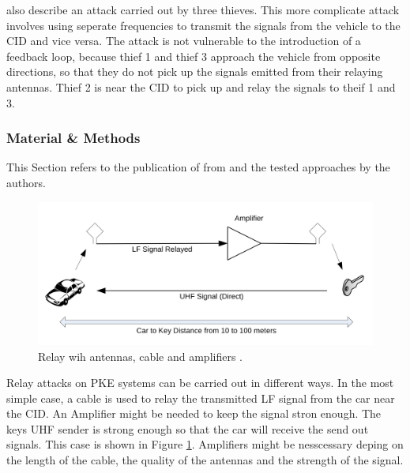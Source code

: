 	\label{par:threeThieves}
	\citeauthor{someAttacksPKES} also describe an attack carried out by three thieves.
	This more complicate attack involves using seperate frequencies to transmit the signals
	from the vehicle to the CID and vice versa.
	The attack is not vulnerable to the introduction of a feedback loop,
	because thief 1 and thief 3 approach the vehicle from opposite directions,
	so that they do not pick up the signals emitted from their relaying antennas.
	Thief 2 is near the CID to pick up and relay the signals to theif 1 and 3.

\subsubsection*{Material \& Methods}
	\label{sec:matmet}
	This Section refers to the publication of \citeauthor{relayAttacksFranc} from \citeyear{relayAttacksFranc}
	and the tested approaches by the authors.

	\begin{figure}[t]
		\begin{center}
			\includegraphics[width=\textwidth]{pictures/franc_relay_over_the_wire.png}
		\end{center}
		\caption{Relay wih antennas, cable and amplifiers \citep[p. 5]{relayAttacksFranc}.}
		\label{fig:relayOTW}
	\end{figure}

	Relay  attacks on PKE systems can be carried out in different ways.
	In the most simple case,
	a cable is used to relay the transmitted LF signal from the car near the CID.
	An Amplifier might be needed to keep the signal stron enough.
	The keys UHF sender is strong enough so that the car will receive the send out signals.
	This case is shown in Figure \ref{fig:relayOTW}.
	Amplifiers might be nesscessary deping on the length of the cable,
	the quality of the antennas and the strength of the signal.

